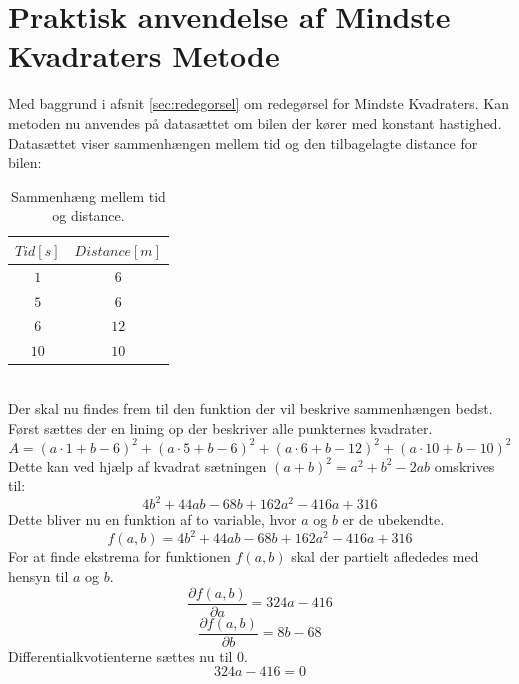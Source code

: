 \section{Praktisk anvendelse af Mindste Kvadraters Metode}\label{sec:udregning}
Med baggrund i afsnit \ref{sec:redegorsel} om redegørsel for Mindste Kvadraters. Kan metoden nu anvendes på datasættet om bilen der kører med konstant hastighed. Datasættet viser sammenhængen mellem tid og den tilbagelagte distance for bilen:
\begin{table}[h!]
    \centering
    \begin{tabular}{|c|c|} \hline
        $Tid [s]$ & $Distance [m]$ \\ \hline
        $1$ & $6$ \\ 
        $5$ & $6$ \\
        $6$ & $12$ \\
        $10$ & $10$ \\ \hline
    \end{tabular}
    \caption{Sammenhæng mellem tid og distance.}
\end{table}\\
Der skal nu findes frem til den funktion der vil beskrive sammenhængen bedst. Først sættes der en lining op der beskriver alle punkternes kvadrater.
\begin{equation*}
    A = (a \cdot 1 + b - 6)^2 + (a \cdot 5 + b - 6)^2 + (a \cdot 6 + b - 12)^2 + (a \cdot 10 + b - 10)^2
\end{equation*}
Dette kan ved hjælp af kvadrat sætningen \begin{math}(a+b)^2 = a^2 + b^2 - 2ab\end{math} omskrives til:
\begin{equation*}
    4b^2+44ab-68b+162a^2-416a+316
\end{equation*}
Dette bliver nu en funktion af to variable, hvor $a$ og $b$ er de ubekendte.
\begin{equation*}
    f(a,b) = 4b^2+44ab-68b+162a^2-416a+316
\end{equation*}
For at finde ekstrema for funktionen $f(a,b)$ skal der partielt aflededes med hensyn til $a$ og $b$.
\begin{equation*}
    \frac{\partial f(a,b)}{\partial a} = 324a - 416
\end{equation*}
\begin{equation*}
    \frac{\partial f(a,b)}{\partial b} = 8b - 68
\end{equation*}
Differentialkvotienterne sættes nu til 0.
\begin{equation*}
    324a - 416 = 0
\end{equation*}

